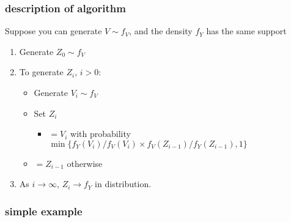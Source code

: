 \subsubsection{description of algorithm \citep[page 254]{CB02}}

Suppose you can generate $V \sim f_V$, and the density $f_Y$ has the same
support
\begin{enumerate}
\item Generate $Z_0 \sim f_V$
\item To generate $Z_i$, $i > 0$:
\begin{itemize}
\item Generate $V_i \sim f_V$
\item Set $Z_i$
\begin{itemize}
\item $= V_i$ with probability $\min\{ f_Y(V_i)/ f_V(V_i)
  \times f_V(Z_{i-1}) / f_Y(Z_{i-1}), 1\}$
\end{itemize}
\item $= Z_{i-1}$ otherwise
\end{itemize}
\item As $i \to \infty$, $Z_i \to f_Y$ in distribution.
\end{enumerate}

\subsubsection{simple example}

